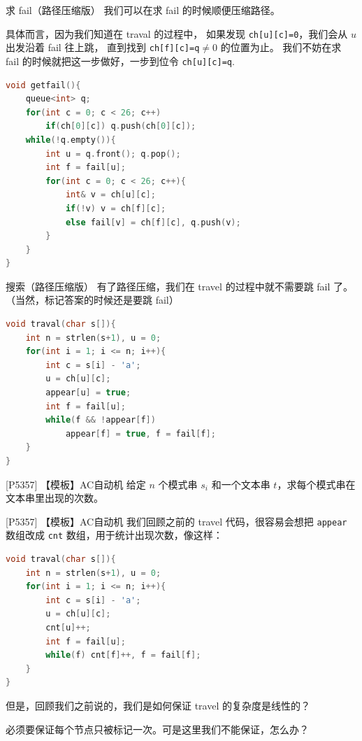 \documentclass{beamer}
\begin{document}
\begin{frame}[fragile]{求 fail（路径压缩版）}
    \small
    我们可以在求 fail 的时候顺便压缩路径。

    \vspace{1em}\pause
    具体而言，因为我们知道在 traval 的过程中，
    如果发现 \verb|ch[u][c]=0|，我们会从 $u$ 出发沿着 fail 往上跳，
    直到找到 \verb|ch[f][c]=q|$\neq 0$ 的位置为止。
    我们不妨在求 fail 的时候就把这一步做好，一步到位令 \verb|ch[u][c]=q|.

    \pause
    \begin{lstlisting}[language=c++]
void getfail(){
    queue<int> q;
    for(int c = 0; c < 26; c++)
        if(ch[0][c]) q.push(ch[0][c]);
    while(!q.empty()){
        int u = q.front(); q.pop();
        int f = fail[u];
        for(int c = 0; c < 26; c++){
            int& v = ch[u][c];
            if(!v) v = ch[f][c];
            else fail[v] = ch[f][c], q.push(v);
        }
    }
}
    \end{lstlisting}
\end{frame}

\begin{frame}[fragile]{搜索（路径压缩版）}
    \small
    有了路径压缩，我们在 travel 的过程中就不需要跳 fail 了。
    （当然，标记答案的时候还是要跳 fail）

    \begin{lstlisting}[language=c++]
void traval(char s[]){
    int n = strlen(s+1), u = 0;
    for(int i = 1; i <= n; i++){
        int c = s[i] - 'a';
        u = ch[u][c];
        appear[u] = true;
        int f = fail[u];
        while(f && !appear[f])
            appear[f] = true, f = fail[f];
    }
}
    \end{lstlisting}
\end{frame}

\begin{frame}[fragile]{[P5357] 【模板】AC自动机}
    \small
    给定 $n$ 个模式串 $s_i$ 和一个文本串 $t$，求每个模式串在文本串里出现的次数。  
\end{frame}

\begin{frame}[fragile]{[P5357] 【模板】AC自动机}
    \footnotesize
    我们回顾之前的 travel 代码，很容易会想把 \verb|appear| 数组改成
    \verb|cnt| 数组，用于统计出现次数，像这样：

    \begin{lstlisting}[language=c++]
void traval(char s[]){
    int n = strlen(s+1), u = 0;
    for(int i = 1; i <= n; i++){
        int c = s[i] - 'a';
        u = ch[u][c];
        cnt[u]++;
        int f = fail[u];
        while(f) cnt[f]++, f = fail[f];
    }
}
    \end{lstlisting}
    \pause

    但是，回顾我们之前说的，我们是如何保证 travel 的复杂度是线性的？

    \vspace{.7em}\pause
    必须要保证每个节点只被标记一次。可是这里我们不能保证，怎么办？
\end{frame}
\end{document}
